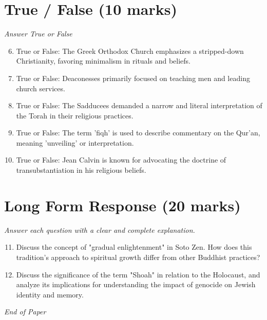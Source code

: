 \documentclass[12pt]{article}
\begin{document}
\section*{True / False (10 marks)}
\textit{Answer True or False}
\begin{enumerate}[label=\arabic*.]
\setcounter{enumi}{5}
\item True or False: The Greek Orthodox Church emphasizes a stripped-down Christianity, favoring minimalism in rituals and beliefs.
\item True or False: Deaconesses primarily focused on teaching men and leading church services.
\item True or False: The Sadducees demanded a narrow and literal interpretation of the Torah in their religious practices.
\item True or False: The term 'fiqh' is used to describe commentary on the Qur'an, meaning 'unveiling' or interpretation.
\item True or False: Jean Calvin is known for advocating the doctrine of transubstantiation in his religious beliefs.
\end{enumerate}

\section*{Long Form Response (20 marks)}
\textit{Answer each question with a clear and complete explanation.}
\begin{enumerate}[label=\arabic*.]
\setcounter{enumi}{10}
\item Discuss the concept of "gradual enlightenment" in Soto Zen. How does this tradition's approach to spiritual growth differ from other Buddhist practices?
\item Discuss the significance of the term "Shoah" in relation to the Holocaust, and analyze its implications for understanding the impact of genocide on Jewish identity and memory.
\end{enumerate}

\vfill
\noindent\textit{End of Paper}
\end{document}
